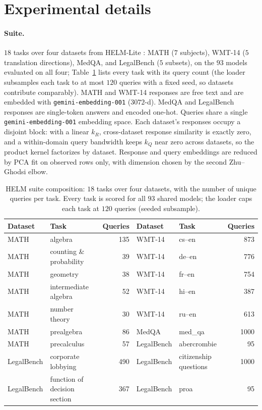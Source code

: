 \documentclass{article}
\theoremstyle{definition}
\theoremstyle{remark}
\theoremstyle{plain}
\begin{document}



\appendix
\section{Experimental details}
\label{app:details}

\paragraph{Suite.} $18$ tasks over four datasets from HELM-Lite \citep{helm}: MATH ($7$
subjects), WMT-14 ($5$ translation directions), MedQA, and LegalBench ($5$ subsets), on the
$93$ models evaluated on all four; Table~\ref{tab:helmsuite} lists every task with its
query count (the loader subsamples each task to at most $120$ queries with a fixed seed, so
datasets contribute comparably). MATH and WMT-14 responses are free text and are embedded
with \texttt{gemini-embedding-001} ($3072$-d). MedQA and LegalBench responses are
single-token answers and encoded one-hot. Queries share a single \texttt{gemini-embedding-001}
embedding space. Each dataset's responses occupy a disjoint block: with a linear
$k_R$, cross-dataset response similarity is exactly zero, and a within-domain query
bandwidth keeps $k_Q$ near zero across datasets, so the product kernel factorizes by
dataset. Response and query embeddings are reduced by PCA fit on observed rows
only, with dimension chosen by the second Zhu--Ghodsi elbow.

\begin{table}[h]
\centering
\caption{HELM suite composition: $18$ tasks over four datasets, with the number of unique
queries per task. Every task is scored for all $93$ shared models; the loader caps each
task at $120$ queries (seeded subsample).}
\label{tab:helmsuite}
\footnotesize
\begin{tabular}{llr @{\hspace{2em}} llr}
\toprule
Dataset & Task & Queries & Dataset & Task & Queries \\
\midrule
MATH & algebra & 135 & WMT-14 & cs--en & 873 \\
MATH & counting \& probability & 39 & WMT-14 & de--en & 776 \\
MATH & geometry & 38 & WMT-14 & fr--en & 754 \\
MATH & intermediate algebra & 52 & WMT-14 & hi--en & 387 \\
MATH & number theory & 30 & WMT-14 & ru--en & 613 \\
MATH & prealgebra & 86 & MedQA & med\_qa & 1000 \\
MATH & precalculus & 57 & LegalBench & abercrombie & 95 \\
LegalBench & corporate lobbying & 490 & LegalBench & citizenship questions & 1000 \\
LegalBench & function of decision section & 367 & LegalBench & proa & 95 \\
\bottomrule
\end{tabular}
\end{table}
\end{document}
